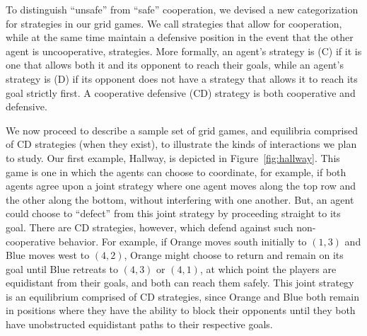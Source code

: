 To distinguish ``unsafe'' from ``safe'' cooperation, we devised a new
categorization for strategies in our grid games.  We call strategies
that allow for cooperation, while at the same time maintain a
defensive position in the event that the other agent is uncooperative,
 strategies.  More formally, an agent's
strategy is  (C) if it is one that allows both it
and its opponent to reach their goals, while an agent's strategy is
 (D) if its opponent does not have a strategy that
allows it to reach its goal strictly first.  A cooperative defensive
(CD) strategy is both cooperative and defensive.

We now proceed to describe a sample set of grid games, and equilibria
comprised of CD strategies (when they exist), to illustrate the kinds
of interactions we plan to study.
%
Our first example, Hallway, is depicted in Figure~\ref{fig:hallway}.
This game is one in which the agents can choose to coordinate, for
example, if both agents agree upon a joint strategy where one agent
moves along the top row and the other along the bottom, without
interfering with one another.  But, an agent could choose to ``defect''
from this joint strategy by proceeding straight to its goal.  There
are CD strategies, however, which defend against such non-cooperative
behavior.
%
For example, if Orange moves south initially to $(1,3)$ and Blue moves
west to $(4,2)$, Orange might choose to return and remain on its goal
until Blue retreats to $(4,3)$ or $(4,1)$, at which point the players
are equidistant from their goals, and both can reach them safely.
This joint strategy is an equilibrium comprised of CD strategies,
since Orange and Blue both remain in positions where they have the
ability to block their opponents until they both have unobstructed
equidistant paths to their respective goals.


